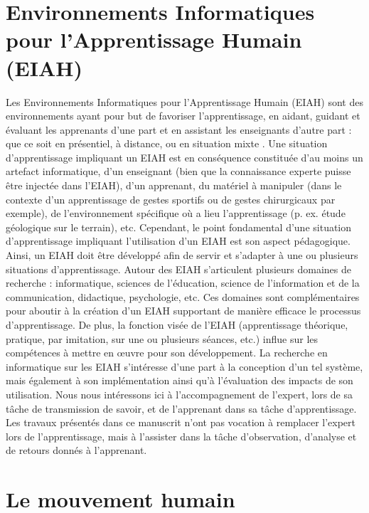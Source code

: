 \section{Environnements Informatiques pour l'Apprentissage Humain (EIAH)}
Les Environnements Informatiques pour l'Apprentissage Humain (EIAH) sont des environnements ayant pour but de favoriser l'apprentissage, en aidant, guidant et évaluant les apprenants d'une part et en assistant les enseignants d'autre part : que ce soit en présentiel, à distance, ou en situation mixte \parencite{Tchounikine2009PdR}. Une situation d'apprentissage impliquant un EIAH est en conséquence constituée d'au moins un artefact informatique, d'un enseignant (bien que la connaissance experte puisse être injectée dans l'EIAH), d'un apprenant, du matériel à manipuler (dans le contexte d'un apprentissage de gestes sportifs ou de gestes chirurgicaux par exemple), de l'environnement spécifique où a lieu l'apprentissage (p. ex. étude géologique sur le terrain), etc. Cependant, le point fondamental d'une situation d'apprentissage impliquant l'utilisation d'un EIAH est son aspect pédagogique. Ainsi, un EIAH doit être développé afin de servir et s'adapter à une ou plusieurs situations d'apprentissage. Autour des EIAH s'articulent plusieurs domaines de recherche : informatique, sciences de l'éducation, science de l'information et de la communication, didactique, psychologie, etc. Ces domaines sont complémentaires pour aboutir à la création d'un EIAH supportant de manière efficace le processus d'apprentissage. De plus, la fonction visée de l'EIAH (apprentissage théorique,  pratique, par imitation, sur une ou plusieurs séances, etc.) influe sur les compétences à mettre en œuvre pour son développement. La recherche en informatique sur les EIAH s'intéresse d'une part à la conception d'un tel système, mais également à son implémentation ainsi qu'à l'évaluation des impacts de son utilisation. Nous nous intéressons ici à l'accompagnement de l'expert, lors de sa tâche de transmission de savoir, et de l'apprenant dans sa tâche d'apprentissage. Les travaux présentés dans ce manuscrit n'ont pas vocation à remplacer l'expert lors de l'apprentissage, mais à l'assister dans la tâche d'observation, d'analyse et de retours donnés à l'apprenant.

\section{Le mouvement humain}
